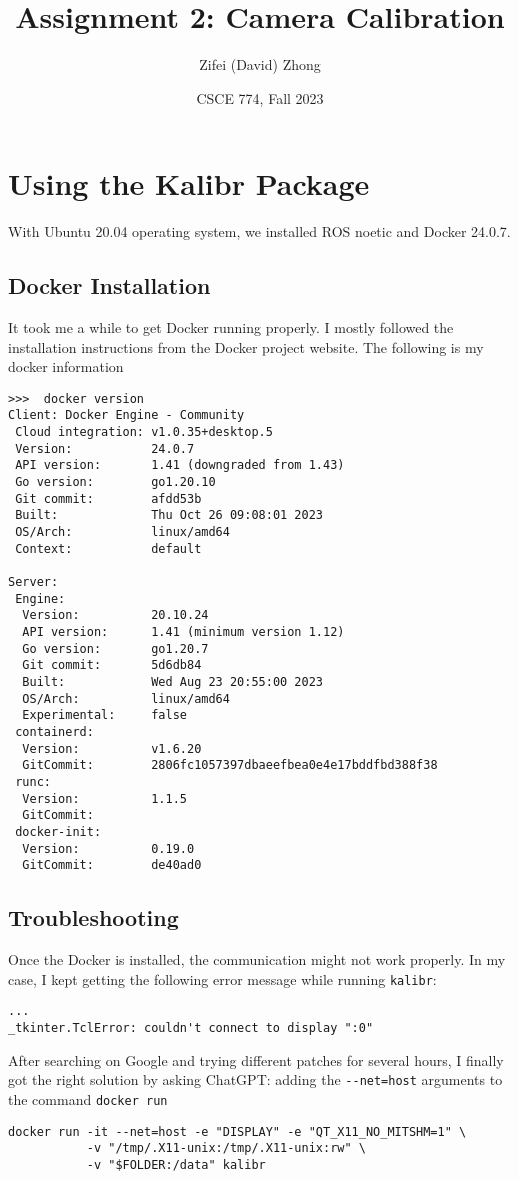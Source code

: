 \documentclass[11pt, oneside]{article}   	%
\title{Assignment 2: Camera Calibration}
\author{Zifei (David) Zhong}
\date{CSCE 774, Fall 2023}							%
\begin{document}
\maketitle

\section{Using the Kalibr Package}
With Ubuntu 20.04 operating system, we installed ROS noetic and Docker 24.0.7.

\subsection{Docker Installation}
It took me a while to get Docker running properly. I mostly followed the installation instructions from the Docker project website. The following is my docker information
\begin{verbatim}
>>>  docker version
Client: Docker Engine - Community
 Cloud integration: v1.0.35+desktop.5
 Version:           24.0.7
 API version:       1.41 (downgraded from 1.43)
 Go version:        go1.20.10
 Git commit:        afdd53b
 Built:             Thu Oct 26 09:08:01 2023
 OS/Arch:           linux/amd64
 Context:           default

Server:
 Engine:
  Version:          20.10.24
  API version:      1.41 (minimum version 1.12)
  Go version:       go1.20.7
  Git commit:       5d6db84
  Built:            Wed Aug 23 20:55:00 2023
  OS/Arch:          linux/amd64
  Experimental:     false
 containerd:
  Version:          v1.6.20
  GitCommit:        2806fc1057397dbaeefbea0e4e17bddfbd388f38
 runc:
  Version:          1.1.5
  GitCommit:        
 docker-init:
  Version:          0.19.0
  GitCommit:        de40ad0

\end{verbatim}

\subsection{Troubleshooting}
Once the Docker is installed, the communication might not work properly. In my case, I kept getting the following error message while running \verb+kalibr+:
\begin{verbatim}
...
_tkinter.TclError: couldn't connect to display ":0" 
\end{verbatim}

After searching on Google and trying different patches for several hours, I finally got the right solution by asking ChatGPT: adding the \verb+--net=host+ arguments to the command \verb+docker run+
\begin{verbatim}
docker run -it --net=host -e "DISPLAY" -e "QT_X11_NO_MITSHM=1" \
           -v "/tmp/.X11-unix:/tmp/.X11-unix:rw" \
           -v "$FOLDER:/data" kalibr
\end{verbatim}
\end{document}
